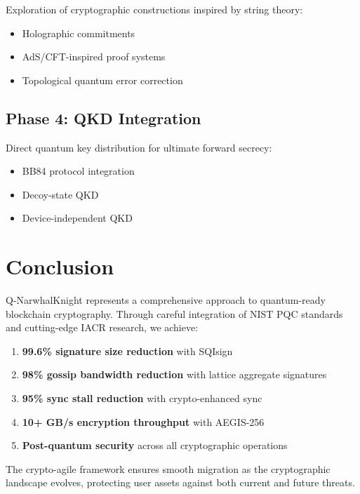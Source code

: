 \documentclass[11pt,a4paper]{article}
\begin{document}
Exploration of cryptographic constructions inspired by string theory:

\begin{itemize}
    \item Holographic commitments
    \item AdS/CFT-inspired proof systems
    \item Topological quantum error correction
\end{itemize}

\subsection{Phase 4: QKD Integration}

Direct quantum key distribution for ultimate forward secrecy:

\begin{itemize}
    \item BB84 protocol integration
    \item Decoy-state QKD
    \item Device-independent QKD
\end{itemize}

\section{Conclusion}

Q-NarwhalKnight represents a comprehensive approach to quantum-ready blockchain cryptography. Through careful integration of NIST PQC standards and cutting-edge IACR research, we achieve:

\begin{enumerate}
    \item \textbf{99.6\% signature size reduction} with SQIsign
    \item \textbf{98\% gossip bandwidth reduction} with lattice aggregate signatures
    \item \textbf{95\% sync stall reduction} with crypto-enhanced sync
    \item \textbf{10+ GB/s encryption throughput} with AEGIS-256
    \item \textbf{Post-quantum security} across all cryptographic operations
\end{enumerate}

The crypto-agile framework ensures smooth migration as the cryptographic landscape evolves, protecting user assets against both current and future threats.
\end{document}
